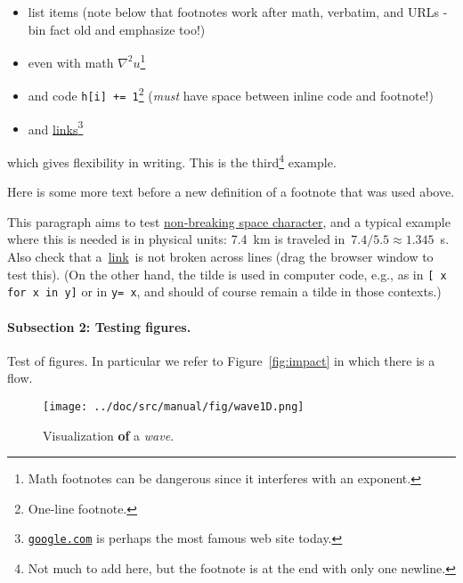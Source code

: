 \documentclass[%
oneside,                 %
final,                   %
10pt]{article}
\newenvironment{notice_mdfboxadmon}[1][]{
\begin{notice_mdfboxmdframed}[frametitle=#1]
}
{
\end{notice_mdfboxmdframed}
}
\theoremstyle{definition}
\begin{document}
\begin{enumerate}
\begin{itemize}
 \item list items (note below that footnotes work after math, verbatim, and URLs - bin fact old and emphasize too!)

 \item even with math $\nabla^2u$\footnote{Math footnotes can be dangerous since it interferes with an exponent.}

 \item and code \texttt{h[i] += 1}\footnote{One-line footnote.}
   (\emph{must} have space between inline code and footnote!)

 \item and \href{{https://google.com}}{links}\footnote{\href{{google.com}}{\nolinkurl{google.com}} is perhaps the most famous web site today.}
\end{itemize}

\noindent
which gives flexibility in writing.
This is the third\footnote{Not much to add here, but the footnote is at the end with only one newline.} example.

Here is some more text before a new definition of a footnote that was
used above.


\begin{notice_mdfboxadmon}
This paragraph aims to test \href{{https://en.wikipedia.org/wiki/Non-breaking_space}}{non-breaking space character}, and a typical
example where this is needed is in physical units: 7.4~km is traveled
in~$7.4/5.5\approx 1.345$~s.  Also check that a~\href{{https://google.com}}{link}~is
not broken across lines (drag the browser window to test this).
(On the other hand, the tilde is used in
computer code, e.g., as in \texttt{[~x for x in y]} or in \texttt{y=~x}, and should
of course remain a tilde in those contexts.)
\end{notice_mdfboxadmon} %



\paragraph{Subsection 2: Testing figures.}
\label{subsec:ex}

Test of figures. In particular we refer to Figure~\vref{fig:impact} in which
there is a flow.

\begin{figure}[!ht]  %
  \centerline{\texttt{[image: ../doc/src/manual/fig/wave1D.png]}}
  \caption{
  Visualization \textbf{of} a \emph{wave}. \label{fig:impact}
  }
\end{figure}


\end{enumerate}
\end{document}
